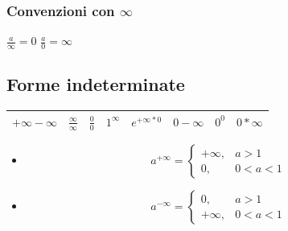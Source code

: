 \subsubsection{Convenzioni con $\infty$}
$\frac{a}{\infty}=0$ $\frac{a}{0}=\infty$

\subsection{Forme indeterminate}
\begin{tabular}{|llllllll|}
	\hline
	$+\infty-\infty$&$\frac{\infty}{\infty}$&$\frac{0}{0}$&$1^\infty$&$e^{+\infty*0}$&$0-\infty$&$0^0$&$0*\infty$\\
	\hline
\end{tabular}
\begin{itemize}
	\item 
	\begin{equation*}
		a^{+\infty}=\begin{cases}
			+\infty,&a>1\\
			0,&0<a<1
		\end{cases}
	\end{equation*}
	\item 
	\begin{equation*}
		a^{-\infty}=\begin{cases}
			0,&a>1\\
			+\infty,&0<a<1
		\end{cases}
	\end{equation*}
\end{itemize}
